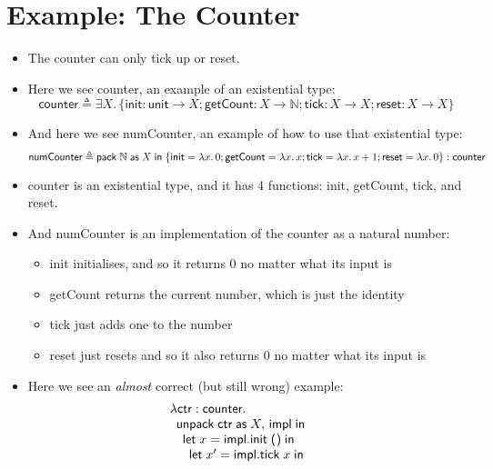 \documentclass{lecturenotes}
\newcommand{\abs}[2]{\ensuremath{\lambda #1.\,#2}}
\newcommand{\app}[2]{\ensuremath{#1\;#2}}
\newcommand{\utype}{\textsf{unit}\xspace}
\newcommand{\unit}{\ensuremath{\textsf{(}\mkern0.5mu\textsf{)}}}
\newcommand{\extype}[2]{\ensuremath{\exists #1.\,#2}}
\newcommand{\pack}[3]{\ensuremath{\textsf{pack}\mkern5mu#1\mathrel{\textsf{as}}#2\mathrel{\textsf{in}}#3}}
\begin{document}
\section{Example: The Counter}
\label{sec:counter}
\begin{itemize}
\item The counter can only tick up or reset. 
\item Here we see \textsf{counter}, an example of an existential type:
  $$\textsf{counter} \triangleq \extype{X}{\{\textsf{init} : \utype \to X; \textsf{getCount} : X \to \mathbb{N}; \textsf{tick} : X \to X; \textsf{reset} : X \to X\}}$$
\item And here we see \textsf{numCounter}, an example of how to use that existential type:
  $$\textsf{numCounter} \triangleq \pack{\mathbb{N}}{X}{\{\textsf{init} = \abs{x}{0}; \textsf{getCount} = \abs{x}{x}; \textsf{tick} = \abs{x}{x + 1}; \textsf{reset} = \abs{x}{0}\}} : \textsf{counter}$$
\item \textsf{counter} is an existential type, and it has 4 functions: \textsf{init}, \textsf{getCount}, \textsf{tick}, and \textsf{reset}.
\item And \textsf{numCounter} is an implementation of the counter as a natural number:
    \begin{itemize}
    \item \textsf{init} initialises, and so it returns 0 no matter what its input is
    \item \textsf{getCount} returns the current number, which is just the identity 
    \item \textsf{tick} just adds one to the number
    \item \textsf{reset} just resets and so it also returns 0 no matter what its input is
    \end{itemize}
\item Here we see an \emph{almost} correct (but still wrong) example:
  $$
  \begin{array}{l}
    \lambda \textsf{ctr} \mathrel{:} \textsf{counter}.\\
    \begin{array}{l}
      \textsf{unpack}\mkern5mu\textsf{ctr} \mathrel{\textsf{as}} X,\, \textsf{impl}\;\textsf{in}\\
      \begin{array}{l}
        \textsf{let}\mkern5mux = \app{\textsf{impl}.\textsf{init}}{\unit}\;\textsf{in}\\
        \begin{array}{l}
          \textsf{let}\mkern5mux' = \app{\textsf{impl}.\textsf{tick}}{x}\;\textsf{in}\\

\end{array}
\end{array}
\end{array}
\end{array}$$
\end{itemize}
\end{document}
